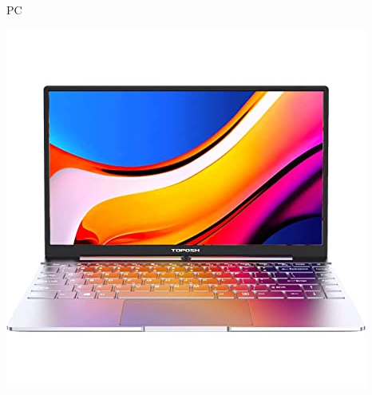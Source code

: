 \documentclass[10pt,xcolor={dvipsnames}]{beamer}
\begin{document}
\begin{frame}{PC}
\begin{center}
\includegraphics[scale=0.25]{Figures/Portatil}
\end{center}
\end{frame}
\end{document}
